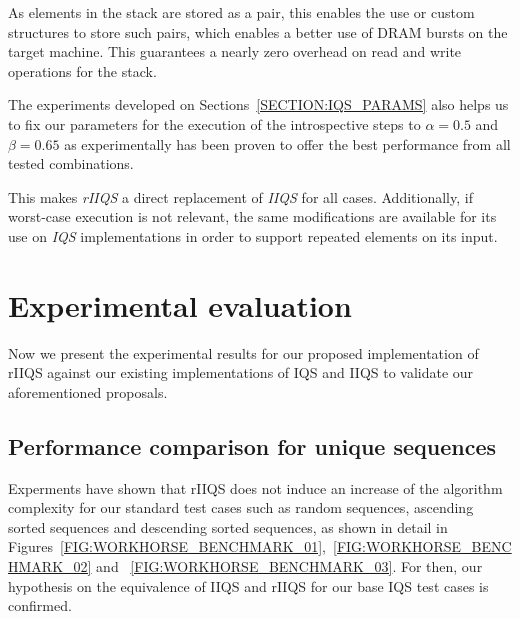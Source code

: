 As elements in the stack are stored as a pair, this enables the use or custom structures to store such pairs, which enables a better use of DRAM bursts on the target machine. This guarantees a nearly zero overhead on read and write operations for the stack.

The experiments developed on Sections~\ref{SECTION:IQS_PARAMS} also helps us to fix our parameters for the execution of the introspective steps to $\alpha=0.5$ and $\beta=0.65$ as experimentally has been proven to offer the best performance from all tested combinations.

This makes \emph{rIIQS} a direct replacement of \emph{IIQS} for all cases. Additionally, if worst-case execution is not relevant, the same modifications are available for its use on \emph{IQS} implementations in order to support repeated elements on its input.

\section{Experimental evaluation}

Now we present the experimental results for our proposed implementation of rIIQS against our existing implementations of IQS and IIQS to validate our aforementioned proposals.


\subsection{Performance comparison for unique sequences}

Experments have shown that rIIQS does not induce an increase of the algorithm complexity for our standard test cases such as random sequences, ascending sorted sequences and descending sorted sequences, as shown in detail in Figures~\ref{FIG:WORKHORSE_BENCHMARK_01},~\ref{FIG:WORKHORSE_BENCHMARK_02} and ~\ref{FIG:WORKHORSE_BENCHMARK_03}. For then, our hypothesis on the equivalence of IIQS and rIIQS for our base IQS test cases is confirmed. 


